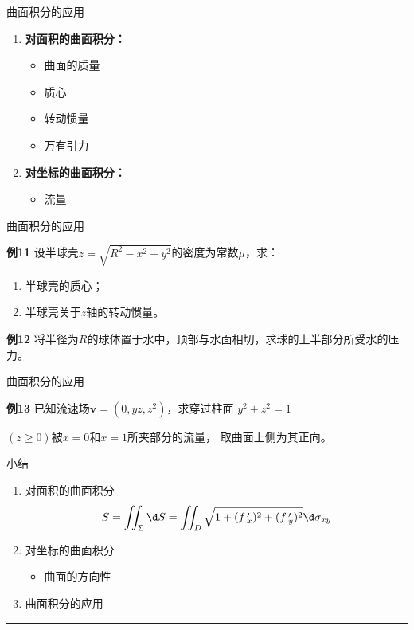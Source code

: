 \begin{frame}{曲面积分的应用}
	\linespread{1.5}\pause 
	\begin{enumerate}
	  \item {\bf 对面积的曲面积分：}\pause 
	  \begin{itemize}
	    \item 曲面的质量\pause 
	    \item 质心\pause 
	    \item 转动惯量\pause 
	    \item 万有引力\pause 
	  \end{itemize}
	  \item {\bf 对坐标的曲面积分：}\pause 
	  \begin{itemize}
	    \item 流量
	  \end{itemize}
	\end{enumerate}
\end{frame}

\begin{frame}{曲面积分的应用}
	\linespread{1.2}
	\begin{exampleblock}{{\bf 例11}\hfill}
		设半球壳$z=\sqrt{R^2-x^2-y^2}$的密度为常数$\mu$，求：
		\begin{enumerate}
		  \item 半球壳的质心；
		  \item 半球壳关于$z$轴的转动惯量。
		\end{enumerate}
	\end{exampleblock}
	\bigskip\pause 
	\begin{exampleblock}{{\bf 例12}\hfill}
		将半径为$R$的球体置于水中，顶部与水面相切，求球的上半部分所受水的压力。
	\end{exampleblock}
\end{frame}

\begin{frame}{曲面积分的应用}
	\linespread{1.2}
	\begin{exampleblock}{{\bf 例13}\hfill}
		已知流速场$\bm{v}=(0,yz,z^2)$，求穿过柱面
		$y^2+z^2=1 $
		
		$(z\geq 0)$被$x=0$和$x=1$所夹部分的流量，
		取曲面上侧为其正向。
	\end{exampleblock}
\end{frame}

\begin{frame}{小结}
	\linespread{1.2}
	\begin{enumerate}
	  \item 对面积的曲面积分
	  $$S=\iint_{\Sigma}\d S=\iint_D\sqrt{1+(f\,'_x)^2+(f\,'_y)^2}\d\sigma_{xy}$$
	  \item 对坐标的曲面积分
	  \begin{itemize}
	    \item 曲面的方向性
	  \end{itemize}
	  \item 曲面积分的应用
	\end{enumerate}
	\hrule
	\begin{center}
	\end{center}
\end{frame}

